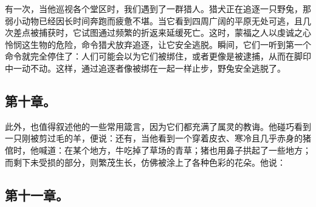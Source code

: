 有一次，当他巡视各个堂区时，我们遇到了一群猎人。猎犬正在追逐一只野兔，那弱小动物已经因长时间奔跑而疲惫不堪。当它看到四周广阔的平原无处可逃，且几次差点被捕获时，它试图通过频繁的折返来延缓死亡。这时，蒙福之人以虔诚之心怜悯这生物的危险，命令猎犬放弃追逐，让它安全逃脱。瞬间，它们一听到第一个命令就完全停住了：人们可能会以为它们被绑住，或者更像是被逮捕，从而在脚印中一动不动。这样，通过追逐者像被绑在一起一样止步，野兔安全逃脱了。\newline{}\par


\subsection{第十章。\newline{}}

此外，也值得叙述他的一些常用箴言，因为它们都充满了属灵的教诲。他碰巧看到一只刚被剪过毛的羊，便说：还有，当他看到一个穿着皮衣、寒冷且几乎赤身的猪倌时，他喊道：在某个地方，牛吃掉了草场的青草；猪也用鼻子拱起了一些地方；而剩下未受损的部分，则繁茂生长，仿佛被涂上了各种色彩的花朵。他说：\newline{}\par


\subsection{第十一章。\newline{}}

